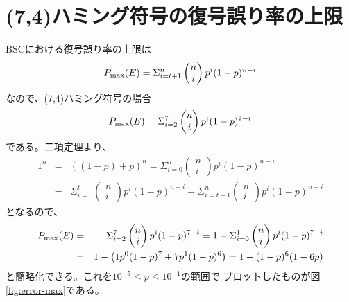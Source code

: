 \documentclass[a4paper,11pt]{jsarticle}
\begin{document}
\section{(7,4)ハミング符号の復号誤り率の上限}
BSCにおける復号誤り率の上限は
\begin{equation*}
  P_{\rm max}(E) = \Sigma_{i=t+1}^{n}
  \begin{pmatrix}
    n \\ i
  \end{pmatrix}
  p^i(1-p)^{n-i}
\end{equation*}
なので、(7,4)ハミング符号の場合
\begin{equation*}
  P_{\rm max}(E) = \Sigma_{i=2}^{7}
  \begin{pmatrix}
    n \\ i
  \end{pmatrix}
  p^i(1-p)^{7-i}
\end{equation*}
である。二項定理より、
\begin{eqnarray*}
  1^n&=&((1-p)+p)^n=\Sigma_{i=0}^n
  \begin{pmatrix}
    n \\ i
  \end{pmatrix}
  p^i(1-p)^{n-i} \\
  &=&\Sigma_{i=0}^{t}
  \begin{pmatrix}
    n \\ i
  \end{pmatrix}
  p^i(1-p)^{n-i}+
  \Sigma_{i=t+1}^{n}
  \begin{pmatrix}
    n \\ i
  \end{pmatrix}
  p^i(1-p)^{n-i}
\end{eqnarray*}
となるので、
\begin{eqnarray*}
  P_{\rm max}(E)&=&\Sigma_{i=2}^{7}
  \begin{pmatrix}
    n \\ i
  \end{pmatrix}
  p^i(1-p)^{7-i}
  =1-\Sigma_{i=0}^{1}
  \begin{pmatrix}
    n \\ i
  \end{pmatrix}
  p^i(1-p)^{7-i} \\
  &=& 1-\left(
    1p^0(1-p)^{7}+7p^1(1-p)^{6}
  \right)=1-(1-p)^6(1-6p)
\end{eqnarray*}
と簡略化できる。これを$10^{-5} \leq p \leq 10^{-1}$の範囲で
プロットしたものが図\ref{fig:error-max}である。
\end{document}
